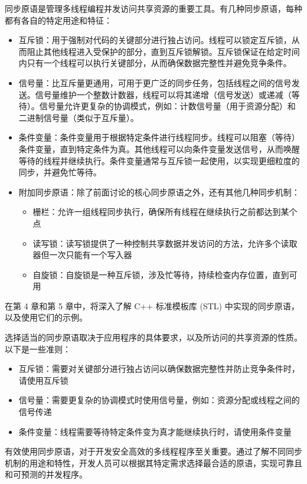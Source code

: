 

同步原语是管理多线程编程并发访问共享资源的重要工具。有几种同步原语，每种都有各自的特定用途和特征：

\begin{itemize}
\item
互斥锁：用于强制对代码的关键部分进行独占访问。线程可以锁定互斥锁，从而阻止其他线程进入受保护的部分，直到互斥锁解锁。互斥锁保证在给定时间内只有一个线程可以执行关键部分，从而确保数据完整性并避免竞争条件。

\item
信号量：比互斥量更通用，可用于更广泛的同步任务，包括线程之间的信号发送。信号量维护一个整数计数器，线程可以将其递增（信号发送）或递减（等待）。信号量允许更复杂的协调模式，例如：计数信号量（用于资源分配）和二进制信号量（类似于互斥量）。

\item
条件变量：条件变量用于根据特定条件进行线程同步。线程可以阻塞（等待）条件变量，直到特定条件为真。其他线程可以向条件变量发送信号，从而唤醒等待的线程并继续执行。条件变量通常与互斥锁一起使用，以实现更细粒度的同步，并避免忙等待。

\item
附加同步原语：除了前面讨论的核心同步原语之外，还有其他几种同步机制：

\begin{itemize}
\item
栅栏：允许一组线程同步执行，确保所有线程在继续执行之前都达到某个点

\item
读写锁：读写锁提供了一种控制共享数据并发访问的方法，允许多个读取器但一次只能有一个写入器

\item
自旋锁：自旋锁是一种互斥锁，涉及忙等待，持续检查内存位置，直到可用
\end{itemize}
\end{itemize}

在第 4 章和第 5 章中，将深入了解 C++ 标准模板库 (STL) 中实现的同步原语，以及使用它们的示例。


选择适当的同步原语取决于应用程序的具体要求，以及所访问的共享资源的性质。以下是一些准则：

\begin{itemize}
\item
互斥锁：需要对关键部分进行独占访问以确保数据完整性并防止竞争条件时，请使用互斥锁

\item
信号量：需要更复杂的协调模式时使用信号量，例如：资源分配或线程之间的信号传递

\item
条件变量：线程需要等待特定条件变为真才能继续执行时，请使用条件变量
\end{itemize}

有效使用同步原语，对于开发安全高效的多线程程序至关重要。通过了解不同同步机制的用途和特性，开发人员可以根据其特定需求选择最合适的原语，实现可靠且和可预测的并发程序。



























